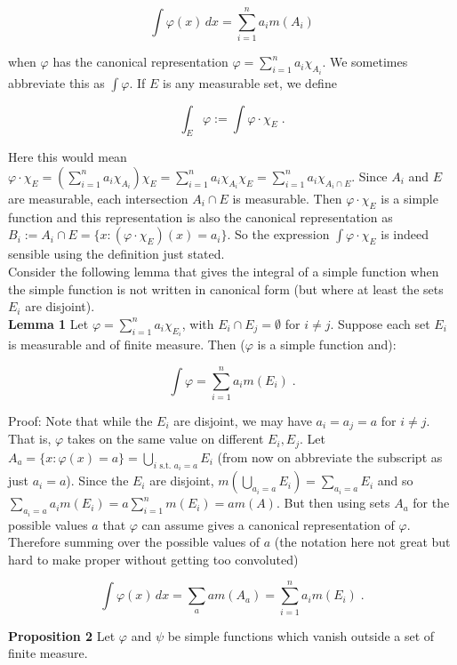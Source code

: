 \documentclass[a4paper]{article}
\begin{document}
$$\int \varphi(x) \, dx = \sum_{i=1}^n a_i m(A_i)$$

when $\varphi$ has the canonical representation $\varphi = \sum_{i=1}^n a_i \chi_{A_i}$. We sometimes abbreviate this as $\int \varphi$. If $E$ is any measurable set, we define

$$\int_E \varphi := \int \varphi \cdot \chi_E \;.$$

Here this would mean $\varphi \cdot \chi_E = \left(\sum_{i=1}^n a_i \chi_{A_i} \right)\chi_E = \sum_{i=1}^n a_i \chi_{A_i}\chi_E = \sum_{i=1}^n a_i \chi_{A_i\cap E}$. Since $A_i$ and $E$ are measurable, each intersection $A_i\cap E$ is measurable. Then $\varphi \cdot \chi_E$ is a simple function and this representation is also the canonical representation as $B_i := A_i \cap E = \{x : (\varphi \cdot \chi_E)(x) = a_i\}$. So the expression $\int \varphi \cdot \chi_E$ is indeed sensible using the definition just stated. \\

Consider the following lemma that gives the integral of a simple function when the simple function is not written in canonical form (but where at least the sets $E_i$ are disjoint).\\

{\bf Lemma 1} Let $\varphi = \sum_{i=1}^n a_i \chi_{E_i}$, with $E_i \cap E_j = \emptyset$ for $i\neq j$. Suppose each set $E_i$ is measurable and of finite measure. Then ($\varphi$ is a simple function and):

$$\int \varphi = \sum_{i=1}^n a_i m(E_i) \; .$$

Proof: Note that while the $E_i$ are disjoint, we may have $a_i = a_j = a$ for $i\neq j$. That is, $\varphi$ takes on the same value on different $E_i, E_j$. Let $A_a = \{x : \varphi(x) = a\} = \bigcup_{i \text{ s.t. } a_i = a} E_i$ (from now on abbreviate the subscript as just $a_i = a$). Since the $E_i$ are disjoint, $m\left(\bigcup_{a_i = a} E_i\right) = \sum_{a_i = a} E_i$ and so $\sum_{a_i = a} a_i m(E_i) = a\sum_{i=1}^n m(E_i) = am(A)$. But then using sets $A_a$ for the possible values $a$ that $\varphi$ can assume gives a canonical representation of $\varphi$. Therefore summing over the possible values of $a$ (the notation here not great but hard to make proper without getting too convoluted)

$$\int \varphi(x) \, dx = \sum_{a} am(A_a) = \sum_{i=1}^n a_i m(E_i) \;. $$

{\bf Proposition 2} Let $\varphi$ and $\psi$ be simple functions which vanish outside a set of finite measure. 
\end{document}
